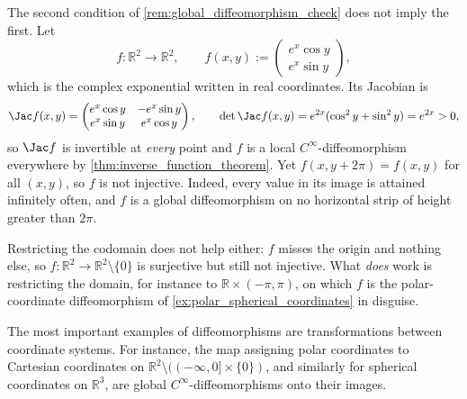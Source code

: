 \begin{example}
\label{ex:local_invertible_not_globally_injective}
The second condition of \cref{rem:global_diffeomorphism_check} does not imply the first. Let
\[f : \mathbb{R}^2 \to \mathbb{R}^2, \qquad
  f(x,y) := \begin{pmatrix} e^x\cos y \\ e^x\sin y \end{pmatrix},\]
which is the complex exponential written in real coordinates. Its Jacobian is
\[\Jac f(x,y) = \begin{pmatrix} e^x\cos y & -e^x\sin y \\ e^x\sin y & e^x\cos y\end{pmatrix},
  \qquad \det\Jac f(x,y) = e^{2x}(\cos^2y+\sin^2y) = e^{2x} > 0,\]
so $\Jac f$ is invertible at \emph{every} point and $f$ is a local $C^\infty$-diffeomorphism
everywhere by \cref{thm:inverse_function_theorem}. Yet $f(x,y+2\pi) = f(x,y)$ for all $(x,y)$, so
$f$ is not injective. Indeed, every value in its image is attained infinitely often, and $f$ is a
global diffeomorphism on no horizontal strip of height greater than $2\pi$.

Restricting the codomain does not help either: $f$ misses the origin and nothing else, so
$f : \mathbb{R}^2 \to \mathbb{R}^2\setminus\{0\}$ is surjective but still not injective. What
\emph{does} work is restricting the domain, for instance to
$\mathbb{R} \times (-\pi,\pi)$, on which $f$ is the polar-coordinate diffeomorphism of
\cref{ex:polar_spherical_coordinates} in disguise.
\end{example}

\begin{example}
\label{ex:polar_spherical_coordinates}
The most important examples of diffeomorphisms are transformations between coordinate systems. For instance, the map assigning polar coordinates to Cartesian coordinates on $\mathbb{R}^2 \setminus ( (-\infty, 0] \times \{0\} )$, and similarly for spherical coordinates on $\mathbb{R}^3$, are global $C^\infty$-diffeomorphisms onto their images.
\end{example}

